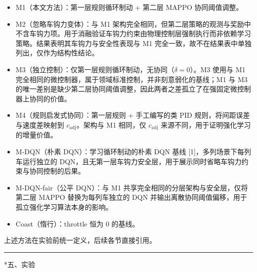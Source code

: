 \documentclass[11pt]{article}
\makeatletter
\renewcommand{\section}{\@startsection{section}{1}{\z@}{-3.5ex \@plus -1ex \@minus -.2ex}{2.3ex \@plus .2ex}{\normalfont\large\bfseries\sffamily}}
\makeatother
\begin{document}
\begin{itemize}
\item M1（本文方法）：第一层规则循环制动 + 第二层 MAPPO 协同阈值调整。
\end{itemize}
\begin{itemize}
\item M2（忽略车钩力变体）：与 M1 架构完全相同，但第二层策略的观测与奖励中不含车钩力项。用于消融验证车钩力约束由物理控制层强制执行而非依赖学习策略。结果表明其车钩力与安全性表现与 M1 完全一致，故不在结果表中单独列出，仅作为结构性结论。
\end{itemize}
\begin{itemize}
\item M3（独立控制）：仅第一层规则循环制动，无协同（$\delta=0$）。M3 使用与 M1 完全相同的微控制器，属于领域标准控制，并非刻意弱化的基线；M1 与 M3 的唯一差别是缺少第二层协同阈值调整，因此两者之差孤立了在强固定微控制器上协同的价值。
\end{itemize}
\begin{itemize}
\item M4（规则启发式协同）：第一层规则 + 手工编写的类 PID 规则，将间距误差与速度差映射到 $c_{\mathrm{adj}}$。架构与 M1 相同，仅 $c_{\mathrm{adj}}$ 来源不同，用于证明强化学习的增量价值。
\end{itemize}
\begin{itemize}
\item M-DQN（朴素 DQN）：学习循环制动的朴素 DQN 基线 [1]，多列场景下每列车运行独立的 DQN，且无第一层车钩力安全层，用于展示同时省略车钩力约束与协同控制的后果。
\end{itemize}
\begin{itemize}
\item M-DQN-fair（公平 DQN）：与 M1 共享完全相同的分层架构与安全层，仅将第二层 MAPPO 替换为每列车独立的 DQN 并输出离散协同阈值偏移，用于孤立强化学习算法本身的影响。
\end{itemize}
\begin{itemize}
\item Coast（惰行）：throttle 恒为 0 的基线。
\end{itemize}


上述方法在实验前统一定义，后续各节直接引用。



\bigskip\hrule\bigskip


\section*{五、实验}
\end{document}
